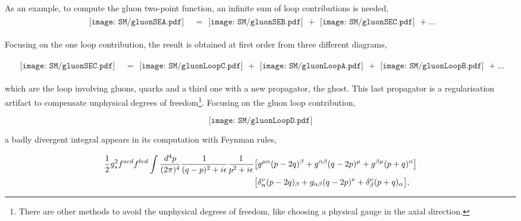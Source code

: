 As an example, to compute the gluon two-point function, an infinite sum of loop contributions is needed,
\begin{align}
\begin{gathered}
    \texttt{[image: SM/gluonSEA.pdf]}
\end{gathered}&=\begin{gathered}\texttt{[image: SM/gluonSEB.pdf]}
\end{gathered}+\begin{gathered}\texttt{[image: SM/gluonSEC.pdf]}
\end{gathered}+...
\end{align}

Focusing on the one loop contribution, the result is obtained at first order from three different diagrams,


\begin{align}
    \begin{gathered}
        \texttt{[image: SM/gluonSEC.pdf]}
    \end{gathered}&=\begin{gathered}\texttt{[image: SM/gluonLoopC.pdf]}
    \end{gathered}+\begin{gathered}\texttt{[image: SM/gluonLoopA.pdf]}
    \end{gathered}+\begin{gathered}\texttt{[image: SM/gluonLoopB.pdf]}
    \end{gathered}+ ...
    \end{align}


which are the loop involving gluons, quarks and a third one with a new propagator, the ghost. This last propagator is a regularisation artifact to compensate unphysical degrees of freedom\footnote{There are other methods to avoid the unphysical degrees of freedom, like choosing a physical gauge in the axial direction.}. Focusing on the gluon loop contribution,

\begin{equation}
\texttt{[image: SM/gluonLoopD.pdf]}
\end{equation}

a badly divergent integral appears in its computation with Feynman rules,  

\begin{align}
    \begin{split} 
        \frac{1}{2}g_s^2f^{acd}f^{bcd}\int\frac{d^4p}{(2\pi)^4} \frac{1}{(q-p)^2+i\epsilon}\frac{1}{p^2+i\epsilon}&\qty[g^{\mu\alpha}(p-2q)^\beta+g^{\alpha\beta}(q-2p)^\mu+g^{\beta\mu}(p+q)^\alpha]\\
       &\qty[\delta_\alpha^\nu(p-2q)_\beta+g_{\alpha\beta}(q-2p)^\nu+\delta_\beta^\nu(p+q)_\alpha],
       \label{ipi}
    \end{split}
    \end{align}

